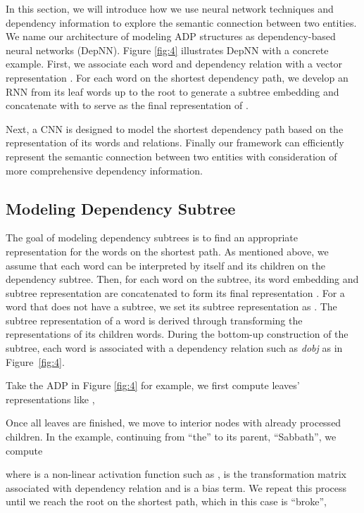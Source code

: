 \documentclass[11pt]{article}
\begin{document}
In this section, we will introduce how we use neural network techniques and dependency information to explore the semantic connection between two entities.
We name our architecture of modeling ADP structures as dependency-based neural networks (DepNN).
Figure \ref{fig:4} illustrates DepNN with a concrete example.
First, we associate each word  and dependency relation   with a vector representation .
For each word  on the shortest dependency path, we develop an RNN from its leaf words up to the root to generate a subtree embedding  and concatenate  with  to serve as the final representation of .



Next, a CNN is designed to model the shortest dependency path based on the representation of its words and relations.
Finally our framework can efficiently represent the semantic connection between two entities with consideration of more comprehensive dependency information.







\subsection{Modeling Dependency Subtree}

The goal of modeling dependency subtrees is to find an appropriate representation for the words on the shortest path.
As mentioned above, we assume that each word  can be interpreted by itself and its children on the dependency subtree.
Then, for each word  on the subtree, its word embedding  and subtree representation   are concatenated to form its final representation .
For a word that does not have a subtree, we set its subtree representation as .
The subtree representation of a word is derived through transforming the representations of its children words.
During the bottom-up construction of the subtree, each word is associated with a dependency relation such as \textit{dobj} as in Figure~\ref{fig:4}.

Take the ADP in Figure \ref{fig:4} for example, we first compute leaves' representations like ,


Once all leaves are finished, we move to interior nodes with
already processed children. In the example, continuing from ``the'' to its parent, ``Sabbath'', we compute

where  is a non-linear activation function such
as ,  is the transformation matrix associated with dependency relation  and  is a bias term. We repeat this process until we reach the root on the shortest path, which in this case is ``broke'',
\end{document}
